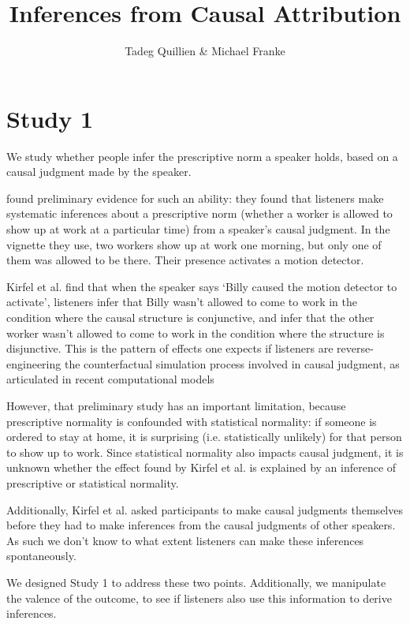 \documentclass[fleqn,reqno,10pt]{article}
\title{Inferences from Causal Attribution}
\author{Tadeg Quillien \& Michael Franke}
\date{}
\begin{document}
\maketitle



\section{Study 1}

We study whether people infer the prescriptive norm a speaker holds, based on a causal judgment made by the speaker. 

\citet{kirfel2022inference} found preliminary evidence for such an ability: they found that listeners make systematic inferences about a prescriptive norm (whether a worker is allowed to show up at work at a particular time) from a speaker's causal judgment. In the vignette they use, two workers show up at work one morning, but only one of them was allowed to be there. Their presence activates a motion detector. 

Kirfel et al. find that when the speaker says `Billy caused the motion detector to activate', listeners infer that Billy wasn't allowed to come to work in the condition where the causal structure is conjunctive, and infer that the other worker wasn't allowed to come to work in the condition where the structure is disjunctive. This is the pattern of effects one expects if listeners are reverse-engineering the counterfactual simulation process involved in causal judgment, as articulated in recent computational models
\citep{icard2017normality, quillien2020when, quillien2023counterfactuals}


However, that preliminary study has an important limitation, because prescriptive normality is confounded with statistical normality: if someone is ordered to stay at home, it is surprising (i.e. statistically unlikely) for that person to show up to work. Since statistical normality also impacts causal judgment, it is unknown whether the effect found by Kirfel et al. is explained by an inference of prescriptive or statistical normality.

Additionally, Kirfel et al. asked participants to make causal judgments themselves before they had to make inferences from the causal judgments of other speakers. As such we don't know to what extent listeners can make these inferences spontaneously.

We designed Study 1 to address these two points. Additionally, we manipulate the valence of the outcome, to see if listeners also use this information to derive inferences.
\end{document}
